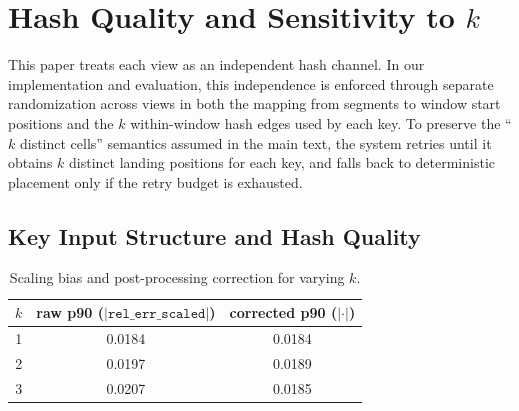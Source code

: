 \section{Hash Quality and Sensitivity to $k$}
\label{sec:appendix-hash}

This paper treats each view as an independent hash channel. In our implementation and evaluation, this independence is enforced through separate randomization across views in both the mapping from segments to window start positions and the $k$ within-window hash edges used by each key. To preserve the ``$k$ distinct cells'' semantics assumed in the main text, the system retries until it obtains $k$ distinct landing positions for each key, and falls back to deterministic placement only if the retry budget is exhausted.


\subsection{Key Input Structure and Hash Quality}


\begin{table}[!htbp]
\centering
\small
\begin{tabular}{rcc}
\toprule
$k$ & \shortstack{raw p90 \\ ($|\texttt{rel\_err\_scaled}|$)} & \shortstack{corrected p90 \\ ($ |\cdot| $)} \\
\midrule
1 & 0.0184 & 0.0184 \\
2 & 0.0197 & 0.0189 \\
3 & 0.0207 & 0.0185 \\
\bottomrule
\end{tabular}
\caption{Scaling bias and post-processing correction for varying $k$.}
\label{tab:c7-a2}
\end{table}

